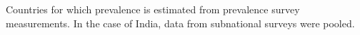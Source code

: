 \label{fig:ps}Countries for which prevalence is estimated from prevalence survey measurements. In the case of India, data from subnational surveys were pooled.